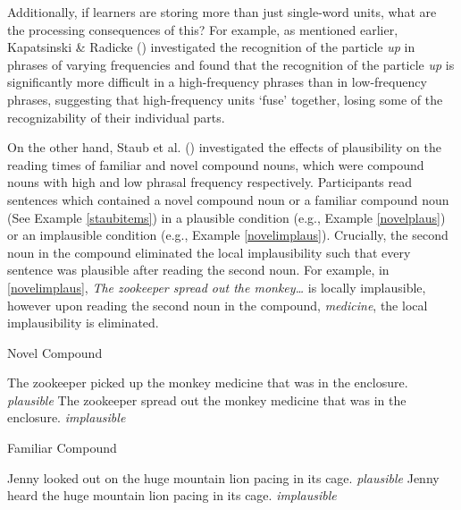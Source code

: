 \documentclass[
  12pt,
  letterpaper,
]{scrreport}
\begin{document}
Additionally, if learners are storing more than just single-word units,
what are the processing consequences of this? For example, as mentioned
earlier, Kapatsinski \& Radicke
()
investigated the recognition of the particle \emph{up} in phrases of
varying frequencies and found that the recognition of the particle
\emph{up} is significantly more difficult in a high-frequency phrases
than in low-frequency phrases, suggesting that high-frequency units
`fuse' together, losing some of the recognizability of their individual
parts.

On the other hand, Staub et al.
() investigated the
effects of plausibility on the reading times of familiar and novel
compound nouns, which were compound nouns with high and low phrasal
frequency respectively. Participants read sentences which contained a
novel compound noun or a familiar compound noun (See Example
\ref{staubitems}) in a plausible condition (e.g., Example
\ref{novelplaus}) or an implausible condition (e.g., Example
\ref{novelimplaus}). Crucially, the second noun in the compound
eliminated the local implausibility such that every sentence was
plausible after reading the second noun. For example, in
\ref{novelimplaus}, \emph{The zookeeper spread out the monkey\ldots{}}
is locally implausible, however upon reading the second noun in the
compound, \emph{medicine}, the local implausibility is eliminated.

\begin{exe}
\ex \label{staubitems}
\begin{xlist}
\ex Novel Compound \label{compound}
\begin{xlist}
\ex The zookeeper picked up the monkey medicine that was in the enclosure. \hfill \emph{plausible} \label{novelplaus}
\ex The zookeeper spread out the monkey medicine that was in the enclosure. \hfill \emph{implausible}\label{novelimplaus}
\end{xlist}
\ex Familiar Compound
\begin{xlist}
\ex Jenny looked out on the huge mountain lion pacing in its cage. \hfill \emph{plausible}\label{familiarplaus}
\ex Jenny heard the huge mountain lion pacing in its cage. \hfill \emph{implausible} \label{familiarimplaus}
\end{xlist}
\end{xlist}
\end{exe}
\end{document}
